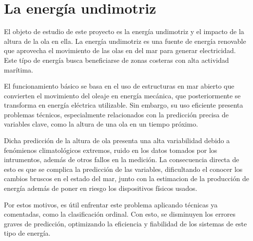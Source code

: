\vspace{1em}



\section{La energía undimotriz}
El objeto de estudio de este proyecto es la energía undimotriz y el impacto de la altura de la ola en ella. La energía undimotriz es una fuente de energía renovable que aprovecha el movimiento de las olas en del mar para generar electricidad. Este típo de energía busca beneficiarse de zonas costeras con alta actividad marítima. 

El funcionamiento básico se basa en el uso de estructuras en mar abierto que convierten el movimiento del oleaje en energía mecánica, que posteriormente se transforma en energía eléctrica utilizable. Sin embargo, su uso eficiente presenta problemas técnicos, especialmente relacionados con la predicción precisa de variables clave, como la altura de una ola en un tiempo próximo.\vspace{1em}

Dicha predicción de la altura de ola presenta una alta variabilidad debido a fenómienos climatológicos extremos, ruido en los datos tomados por los intrumentos, además de otros fallos en la medición. La consecuencia directa de esto es que se complica la predicción de las variables, dificultando el conocer los cambios bruscos en el estado del mar, junto con la estimacion de la producción de energía además de poner en riesgo los dispositivos físicos usados.

Por estos motivos, es útil enfrentar este problema aplicando técnicas ya comentadas, como la clasificación ordinal. Con esto, se disminuyen los errores graves de predicción, optimizando la eficiencia y fiabilidad de los sistemas de este tipo de energía.


